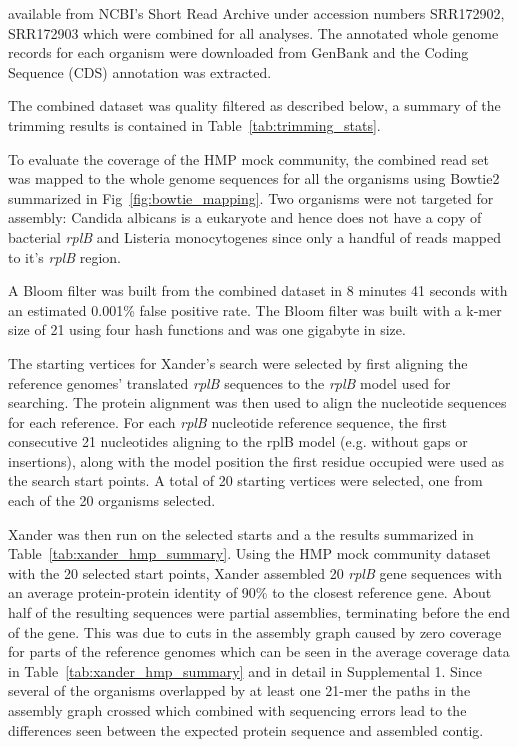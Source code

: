 \documentclass[10pt]{bmc_article}
\newenvironment{bmcformat}{\begin{raggedright}\baselineskip20pt\sloppy\setboolean{publ}{false}}{\end{raggedright}\baselineskip20pt\sloppy}
\begin{document}
\begin{bmcformat}
 available from NCBI's Short Read Archive under accession numbers SRR172902, SRR172903 which were combined for all analyses.  The annotated whole genome records for each organism were downloaded from GenBank and the Coding Sequence (CDS) annotation was extracted.

The combined dataset was quality filtered as described below, a summary of the trimming results is contained in Table~\ref{tab:trimming_stats}.  


To evaluate the coverage of the HMP mock community, the combined read set was mapped to the whole genome sequences for all the organisms using Bowtie2\cite{langmead_fast_2012} summarized in Fig~\ref{fig:bowtie_mapping}.  Two organisms were not targeted for assembly: Candida albicans is a eukaryote and hence does not have a copy of bacterial \emph{rplB} and Listeria monocytogenes since only a handful of reads mapped to it's \emph{rplB} region.

A Bloom filter was built from the combined dataset in 8 minutes 41 seconds with an estimated 0.001\% false positive rate.  The Bloom filter was built with a k-mer size of 21 using four hash functions and was one gigabyte in size.

The starting vertices for Xander's search were selected by first aligning the reference genomes' translated \emph{rplB} sequences to the \emph{rplB} model used for searching.  The protein alignment was then used to align the nucleotide sequences for each reference.  For each \emph{rplB} nucleotide reference sequence, the first consecutive 21 nucleotides aligning to the rplB model (e.g. without gaps or insertions), along with the model position the first residue occupied were used as the search start points.  A total of 20 starting vertices were selected, one from each of the 20 organisms selected.

Xander was then run on the selected starts and a the results summarized in Table~\ref{tab:xander_hmp_summary}.  Using the HMP mock community dataset with the 20 selected start points, Xander assembled 20 \emph{rplB} gene sequences with an average protein-protein identity of 90\% to the closest reference gene.  About half of the resulting sequences were partial assemblies, terminating before the end of the gene.  This was due to cuts in the assembly graph caused by zero coverage for parts of the reference genomes which can be seen in the average coverage data in Table~\ref{tab:xander_hmp_summary} and in detail in Supplemental 1.  Since several of the organisms overlapped by at least one 21-mer the paths in the assembly graph crossed which combined with sequencing errors lead to the differences seen between the expected protein sequence and assembled contig.


\end{bmcformat}
\end{document}
